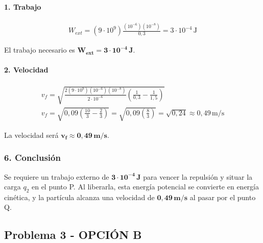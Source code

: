 \paragraph*{1. Trabajo}
\begin{gather}
    W_{ext} = (9\cdot10^9) \frac{(10^{-6})(10^{-8})}{0,3} = 3 \cdot 10^{-4} \, \text{J}
\end{gather}
\begin{cajaresultado}
    El trabajo necesario es $\boldsymbol{W_{ext} = 3 \cdot 10^{-4} \, J}$.
\end{cajaresultado}
\paragraph*{2. Velocidad}
\begin{gather}
    v_f = \sqrt{\frac{2 (9\cdot10^9) (10^{-6}) (10^{-8})}{2 \cdot 10^{-6}} \left(\frac{1}{0,3} - \frac{1}{1,5}\right)} \nonumber \\[8pt]
    v_f = \sqrt{0,09 \left(\frac{10}{3} - \frac{2}{3}\right)} = \sqrt{0,09 \left(\frac{8}{3}\right)} = \sqrt{0,24} \approx 0,49 \, \text{m/s}
\end{gather}
\begin{cajaresultado}
    La velocidad será $\boldsymbol{v_f \approx 0,49 \, m/s}$.
\end{cajaresultado}

\subsubsection*{6. Conclusión}
\begin{cajaconclusion}
    Se requiere un trabajo externo de $\mathbf{3 \cdot 10^{-4} \, J}$ para vencer la repulsión y situar la carga $q_2$ en el punto P. Al liberarla, esta energía potencial se convierte en energía cinética, y la partícula alcanza una velocidad de $\mathbf{0,49 \, m/s}$ al pasar por el punto Q.
\end{cajaconclusion}

\newpage

\subsection{Problema 3 - OPCIÓN B}
\label{subsec:4B_2005_jun_cv}

